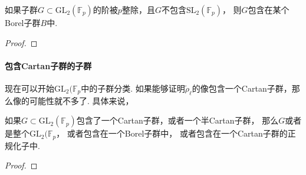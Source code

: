 \begin{cprop}
    如果子群$G\subset \mathrm{GL}_2(\mathbb{F}_p)$的阶被$p$整除，且$G$不包含$\mathrm{SL}_2(\mathbb{F}_p)$，
    则$G$包含在某个Borel子群$B$中.
\end{cprop}

\begin{proof}
\end{proof}

\paragraph{包含Cartan子群的子群}

现在可以开始$\mathrm{GL}_2(\mathbb{F}_p$中的子群分类.
如果能够证明$\tilde{\rho}_{\ell}$的像包含一个Cartan子群，那么像的可能性就不多了.
具体来说，
\begin{cprop}
    如果$G\subset \mathrm{GL}_2(\mathbb{F}_p)$包含了一个Cartan子群，或者一个半Cartan子群，
    那么$G$或者是整个$ \mathrm{GL}_2(\mathbb{F}_p$，
    或者包含在一个Borel子群中，
    或者包含在一个Cartan子群的正规化子中.\label{subgroup_class}
\end{cprop}

\begin{proof}
\end{proof}

